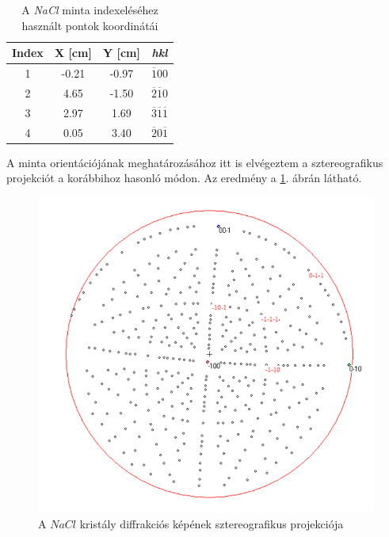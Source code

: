 \documentclass[12pt,a4paper]{article}
\begin{document}
\begin{table}[!h]
\begin{center}
\begin{tabular}{|c|c|c|c|}
\hline
Index & X [cm] & Y [cm] & \emph{hkl} \\
\hline
1 & -0.21 & -0.97 & ${\overline{1}00}$\\
\hline
2 & 4.65 & -1.50 & ${\overline{2}\overline{1}0}$\\
\hline
3 & 2.97 & 1.69 & ${\overline{3}\overline{1}\overline{1}}$\\
\hline
4 & 0.05 & 3.40 & ${\overline{2}0\overline{1}}$\\
\hline
\end{tabular}
\caption{A \emph{NaCl} minta indexeléséhez használt pontok koordinátái}
\label{tab:nacl}
\end{center}
\end{table}
\newpage
A minta orientációjának meghatározásához itt is elvégeztem a sztereografikus projekciót a korábbihoz hasonló módon. Az eredmény a \ref{fig:nacl_sztereo}. ábrán látható.\\

\begin{figure}[!h]
\centering
\includegraphics[scale=1.4]{nacl_sztereo}
\caption{A $NaCl$ kristály diffrakciós képének sztereografikus projekciója}
\label{fig:nacl_sztereo}
\end{figure}
\end{document}
